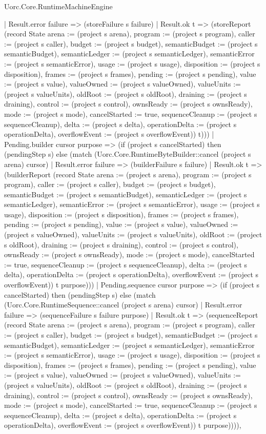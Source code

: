 \begin{lexlean}{Uorc.Core.RuntimeMachineEngine}
\begin{semanticmodule}
{      | Result.error failure => (storeFailure s failure)
      | Result.ok t => (storeReport (record State {arena := (project s arena), program := (project s program), caller := (project s caller), budget := (project s budget), semanticBudget := (project s semanticBudget), semanticLedger := (project s semanticLedger), semanticError := (project s semanticError), usage := (project s usage), disposition := (project s disposition), frames := (project s frames), pending := (project s pending), value := (project s value), valueOwned := (project s valueOwned), valueUnits := (project s valueUnits), oldRoot := (project s oldRoot), draining := (project s draining), control := (project s control), ownsReady := (project s ownsReady), mode := (project s mode), cancelStarted := true, sequenceCleanup := (project s sequenceCleanup), delta := (project s delta), operationDelta := (project s operationDelta), overflowEvent := (project s overflowEvent)}) t)))
    | Pending.builder cursor purpose => (if (project s cancelStarted) then (pendingStep s) else (match (Uorc.Core.RuntimeByteBuilder::cancel (project s arena) cursor)
      | Result.error failure => (builderFailure s failure)
      | Result.ok t => (builderReport (record State {arena := (project s arena), program := (project s program), caller := (project s caller), budget := (project s budget), semanticBudget := (project s semanticBudget), semanticLedger := (project s semanticLedger), semanticError := (project s semanticError), usage := (project s usage), disposition := (project s disposition), frames := (project s frames), pending := (project s pending), value := (project s value), valueOwned := (project s valueOwned), valueUnits := (project s valueUnits), oldRoot := (project s oldRoot), draining := (project s draining), control := (project s control), ownsReady := (project s ownsReady), mode := (project s mode), cancelStarted := true, sequenceCleanup := (project s sequenceCleanup), delta := (project s delta), operationDelta := (project s operationDelta), overflowEvent := (project s overflowEvent)}) t purpose)))
    | Pending.sequence cursor purpose => (if (project s cancelStarted) then (pendingStep s) else (match (Uorc.Core.RuntimeSequence::cancel (project s arena) cursor)
      | Result.error failure => (sequenceFailure s failure purpose)
      | Result.ok t => (sequenceReport (record State {arena := (project s arena), program := (project s program), caller := (project s caller), budget := (project s budget), semanticBudget := (project s semanticBudget), semanticLedger := (project s semanticLedger), semanticError := (project s semanticError), usage := (project s usage), disposition := (project s disposition), frames := (project s frames), pending := (project s pending), value := (project s value), valueOwned := (project s valueOwned), valueUnits := (project s valueUnits), oldRoot := (project s oldRoot), draining := (project s draining), control := (project s control), ownsReady := (project s ownsReady), mode := (project s mode), cancelStarted := true, sequenceCleanup := (project s sequenceCleanup), delta := (project s delta), operationDelta := (project s operationDelta), overflowEvent := (project s overflowEvent)}) t purpose)))),
}
\end{semanticmodule}
\end{lexlean}
